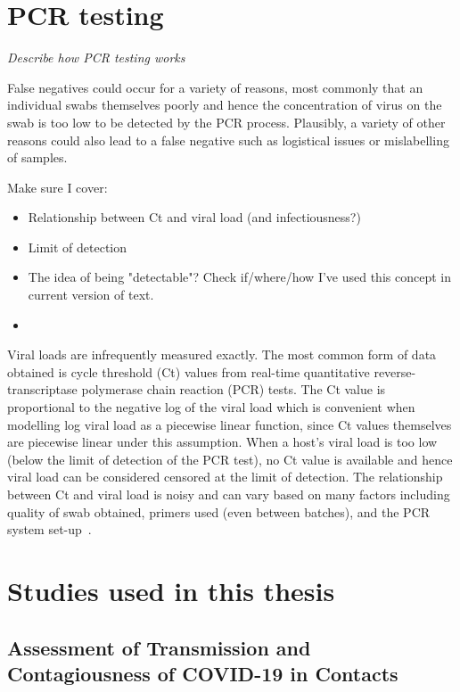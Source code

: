 \documentclass[thesis.tex]{subfiles}
\begin{document}
\section{PCR testing} \label{biology-data:sec:PCR}

\emph{Describe how PCR testing works}

False negatives could occur for a variety of reasons, most commonly that an individual swabs themselves poorly and hence the concentration of virus on the swab is too low to be detected by the PCR process.
Plausibly, a variety of other reasons could also lead to a false negative such as logistical issues or mislabelling of samples.

Make sure I cover:
\begin{itemize}
  \item Relationship between Ct and viral load (and infectiousness?)
  \item Limit of detection
  \item The idea of being "detectable"? Check if/where/how I've used this concept in current version of text.
  \item 
\end{itemize}

Viral loads are infrequently measured exactly.
The most common form of data obtained is cycle threshold (Ct) values from real-time quantitative  reverse-transcriptase polymerase chain reaction (PCR) tests.
The Ct value is proportional to the negative log of the viral load which is convenient when modelling log viral load as a piecewise linear function, since Ct values themselves are piecewise linear under this assumption.
When a host's viral load is too low (below the limit of detection of the PCR test), no Ct value is available and hence viral load can be considered censored at the limit of detection.
The relationship between Ct and viral load is noisy and can vary based on many factors including quality of swab obtained, primers used (even between batches), and the PCR system set-up~\autocites{dahdouhCt,hanRTPCR}.

\section{Studies used in this thesis}

\subsection{Assessment of Transmission and Contagiousness of COVID-19 in Contacts}
\end{document}
